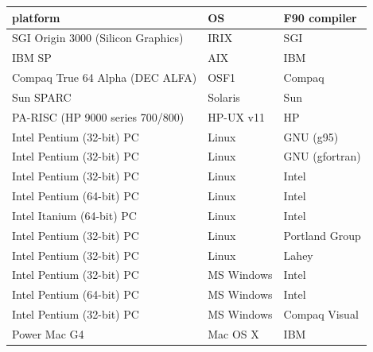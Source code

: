 \documentclass[12pt]{book}
\begin{document}
\begin{table}[htb]
\begin{tabular}{|l|l|l|}
\hline
{\bf platform} & {\bf OS} & {\bf F90 compiler} \\
\hline
SGI Origin 3000 (Silicon Graphics)  & IRIX        & SGI \\
IBM SP                              & AIX         & IBM \\
Compaq True 64 Alpha (DEC ALFA)     & OSF1        & Compaq \\
Sun SPARC                           & Solaris     & Sun \\
PA-RISC (HP 9000 series 700/800)    & HP-UX v11   & HP \\
Intel Pentium (32-bit) PC           & Linux       & GNU (g95) \\
Intel Pentium (32-bit) PC           & Linux       & GNU (gfortran) \\
Intel Pentium (32-bit) PC           & Linux       & Intel \\
Intel Pentium (64-bit) PC           & Linux       & Intel \\
Intel Itanium (64-bit) PC           & Linux       & Intel \\
Intel Pentium (32-bit) PC           & Linux       & Portland Group \\
Intel Pentium (32-bit) PC           & Linux       & Lahey \\
Intel Pentium (32-bit) PC           & MS Windows  & Intel \\
Intel Pentium (64-bit) PC           & MS Windows  & Intel \\
Intel Pentium (32-bit) PC           & MS Windows  & Compaq Visual \\
Power Mac G4                        & Mac OS X    & IBM \\
\hline
\end{tabular}
\end{table}
\end{document}
